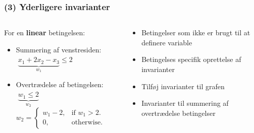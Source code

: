\documentclass[smaller,handouts]{beamer}
\begin{document}

 \begin{frame}
 \frametitle{(3) Yderligere invarianter}
 \begin{columns}[T]
\begin{column}[T]{0.55\linewidth} 
 For en \textbf{linear} betingelsen: 
  \begin{itemize}[<+->]
  \item Summering af venstresiden: $\;\underbrace{x_1 + 2x_2 -x_3}_{w_1} \leq 2$
  \item Overtrædelse af betingelsen: $\; \underbrace{w_1 \leq 2}_{w_2}  $\medskip  \\ 
     $w_2 = \begin{cases}
        w_1-2, & \text{if $w_1> 2$}.\\
        0, & \text{otherwise}.
       \end{cases}$
 \end{itemize}
\end{column}
\pause
\begin{column}[T]{0.5\linewidth} 
 \begin{itemize}[<+->]
  \item \alert{Betingelser som ikke er brugt til at definere variable }
  \item Betingelses specifik oprettelse af invarianter
  \item Tilføj invarianter til grafen
  \item Invarianter til summering af overtrædelse betingelser
\end{itemize}

\end{column}
\end{columns}
 \end{frame}


\end{document}
